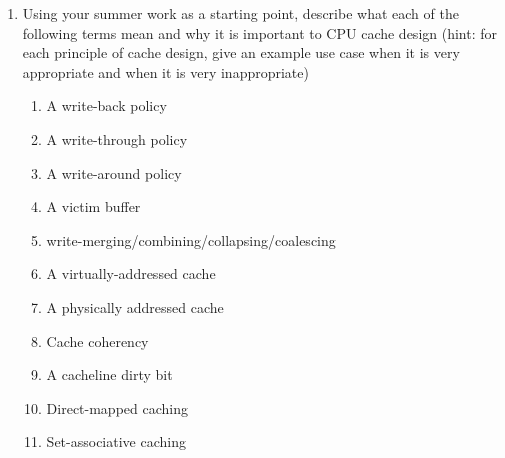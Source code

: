 \documentclass[10pt,\jkfside,a4paper]{article}
\begin{document}
\begin{enumerate}
\begin{examquestion}{2004}{6}{2}
\begin{enumerate}[label=(\alph*)]

\end{enumerate}

\end{examquestion}

\item Using your summer work as a starting point, describe what each of the
following terms mean and why it is important to CPU cache design (hint: for
each principle of cache design, give an example use case when it is very
appropriate and when it is very inappropriate)

\begin{enumerate}[label=(\alph*)]

\item A write-back policy


\item A write-through policy


\item A write-around policy


\item A victim buffer


\item write-merging/combining/collapsing/coalescing


\item A virtually-addressed cache


\item A physically addressed cache


\item Cache coherency


\item A cacheline dirty bit


\item Direct-mapped caching


\item Set-associative caching


\end{enumerate}

\end{enumerate}
\end{document}
